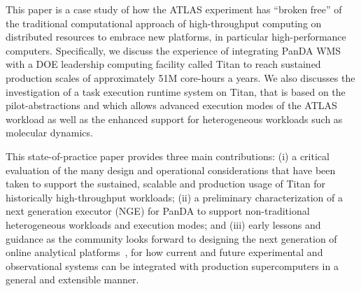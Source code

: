 This paper is a case study of how the ATLAS experiment has ``broken free'' of
the traditional computational approach of high-throughput computing on
distributed resources to embrace new platforms, in particular high-performance
computers. Specifically, we discuss the experience of integrating PanDA WMS with
a DOE leadership computing facility called Titan to reach sustained production
scales of approximately 51M core-hours a years. We also discusses the
investigation of a task execution runtime system on Titan, that is based on the
pilot-abstractions and which allows advanced execution modes of the ATLAS
workload as well as the enhanced support for heterogeneous workloads such as
molecular dynamics.


This state-of-practice paper provides three main contributions:  (i) a critical
evaluation of the many design and operational considerations that have been
taken to support the sustained, scalable and production usage of Titan for
historically high-throughput workloads; (ii) a preliminary characterization of a
next generation executor (NGE) for PanDA to support non-traditional
heterogeneous workloads and execution modes;  and (iii) early lessons and
guidance as the community looks forward to designing the next generation of
online analytical platforms~\cite{foap-url}, for how current and future
experimental and observational systems can be integrated with production
supercomputers in a general and extensible manner.
